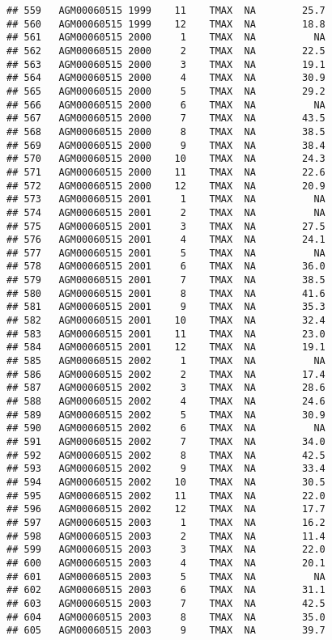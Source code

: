 \documentclass{article}\usepackage[]{graphicx}\usepackage[]{color}
\makeatletter
\newenvironment{kframe}{%
 \def\at@end@of@kframe{}%
 \ifinner\ifhmode%
  \def\at@end@of@kframe{\end{minipage}}%
  \begin{minipage}{\columnwidth}%
 \fi\fi%
 \def\FrameCommand##1{\hskip\@totalleftmargin \hskip-\fboxsep
 \colorbox{shadecolor}{##1}\hskip-\fboxsep
     \hskip-\linewidth \hskip-\@totalleftmargin \hskip\columnwidth}%
 \MakeFramed {\advance\hsize-\width
   \@totalleftmargin\z@ \linewidth\hsize
   \@setminipage}}%
 {\par\unskip\endMakeFramed%
 \at@end@of@kframe}
\newenvironment{knitrout}{}{} %
\makeatother
\begin{document}
\begin{knitrout}
\begin{kframe}
\begin{verbatim}
## 559   AGM00060515 1999    11    TMAX  NA        25.7
## 560   AGM00060515 1999    12    TMAX  NA        18.8
## 561   AGM00060515 2000     1    TMAX  NA          NA
## 562   AGM00060515 2000     2    TMAX  NA        22.5
## 563   AGM00060515 2000     3    TMAX  NA        19.1
## 564   AGM00060515 2000     4    TMAX  NA        30.9
## 565   AGM00060515 2000     5    TMAX  NA        29.2
## 566   AGM00060515 2000     6    TMAX  NA          NA
## 567   AGM00060515 2000     7    TMAX  NA        43.5
## 568   AGM00060515 2000     8    TMAX  NA        38.5
## 569   AGM00060515 2000     9    TMAX  NA        38.4
## 570   AGM00060515 2000    10    TMAX  NA        24.3
## 571   AGM00060515 2000    11    TMAX  NA        22.6
## 572   AGM00060515 2000    12    TMAX  NA        20.9
## 573   AGM00060515 2001     1    TMAX  NA          NA
## 574   AGM00060515 2001     2    TMAX  NA          NA
## 575   AGM00060515 2001     3    TMAX  NA        27.5
## 576   AGM00060515 2001     4    TMAX  NA        24.1
## 577   AGM00060515 2001     5    TMAX  NA          NA
## 578   AGM00060515 2001     6    TMAX  NA        36.0
## 579   AGM00060515 2001     7    TMAX  NA        38.5
## 580   AGM00060515 2001     8    TMAX  NA        41.6
## 581   AGM00060515 2001     9    TMAX  NA        35.3
## 582   AGM00060515 2001    10    TMAX  NA        32.4
## 583   AGM00060515 2001    11    TMAX  NA        23.0
## 584   AGM00060515 2001    12    TMAX  NA        19.1
## 585   AGM00060515 2002     1    TMAX  NA          NA
## 586   AGM00060515 2002     2    TMAX  NA        17.4
## 587   AGM00060515 2002     3    TMAX  NA        28.6
## 588   AGM00060515 2002     4    TMAX  NA        24.6
## 589   AGM00060515 2002     5    TMAX  NA        30.9
## 590   AGM00060515 2002     6    TMAX  NA          NA
## 591   AGM00060515 2002     7    TMAX  NA        34.0
## 592   AGM00060515 2002     8    TMAX  NA        42.5
## 593   AGM00060515 2002     9    TMAX  NA        33.4
## 594   AGM00060515 2002    10    TMAX  NA        30.5
## 595   AGM00060515 2002    11    TMAX  NA        22.0
## 596   AGM00060515 2002    12    TMAX  NA        17.7
## 597   AGM00060515 2003     1    TMAX  NA        16.2
## 598   AGM00060515 2003     2    TMAX  NA        11.4
## 599   AGM00060515 2003     3    TMAX  NA        22.0
## 600   AGM00060515 2003     4    TMAX  NA        20.1
## 601   AGM00060515 2003     5    TMAX  NA          NA
## 602   AGM00060515 2003     6    TMAX  NA        31.1
## 603   AGM00060515 2003     7    TMAX  NA        42.5
## 604   AGM00060515 2003     8    TMAX  NA        35.0
## 605   AGM00060515 2003     9    TMAX  NA        39.7

\end{verbatim}
\end{kframe}
\end{knitrout}
\end{document}
